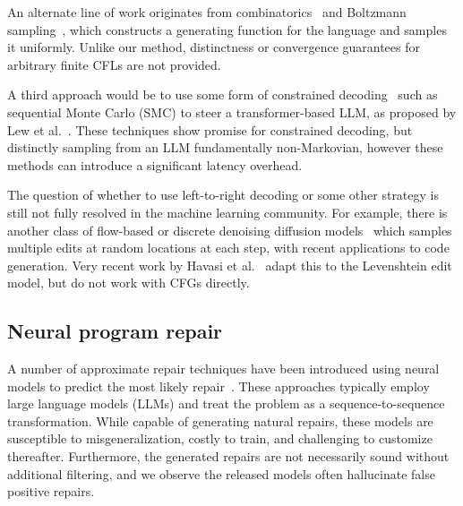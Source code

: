 \documentclass[sigplan,review,acmsmall,nonacm,screen,anonymous]{acmart}\settopmatter{printfolios=false,printccs=false,printacmref=false}
\begin{document}
An alternate line of work originates from combinatorics~\cite{hickey1983uniform, gore1997quasi} and Boltzmann sampling~\cite{duchon2004boltzmann}, which constructs a generating function for the language and samples it uniformly. Unlike our method, distinctness or convergence guarantees for arbitrary finite CFLs are not provided.

A third approach would be to use some form of constrained decoding~\cite{loula2025syntactic} such as sequential Monte Carlo (SMC) to steer a transformer-based LLM, as proposed by Lew et al.~\cite{lew2023sequential}. These techniques show promise for constrained decoding, but distinctly sampling from an LLM fundamentally non-Markovian, however these methods can introduce a significant latency overhead.

The question of whether to use left-to-right decoding or some other strategy is still not fully resolved in the machine learning community. For example, there is another class of flow-based or discrete denoising diffusion models~\cite{austin2021structured} which samples multiple edits at random locations at each step, with recent applications to code generation. Very recent work by Havasi et al.~\cite{havasi2025edit} adapt this to the Levenshtein edit model, but do not work with CFGs directly.


\subsection{Neural program repair}

A number of approximate repair techniques have been introduced using neural models to predict the most likely repair~\cite{allamanis2021self, chirkova2021empirical, drain2021generating}. These approaches typically employ large language models (LLMs) and treat the problem as a sequence-to-sequence transformation. While capable of generating natural repairs, these models are susceptible to misgeneralization, costly to train, and challenging to customize thereafter. Furthermore, the generated repairs are not necessarily sound without additional filtering, and we observe the released models often hallucinate false positive repairs.
\end{document}
